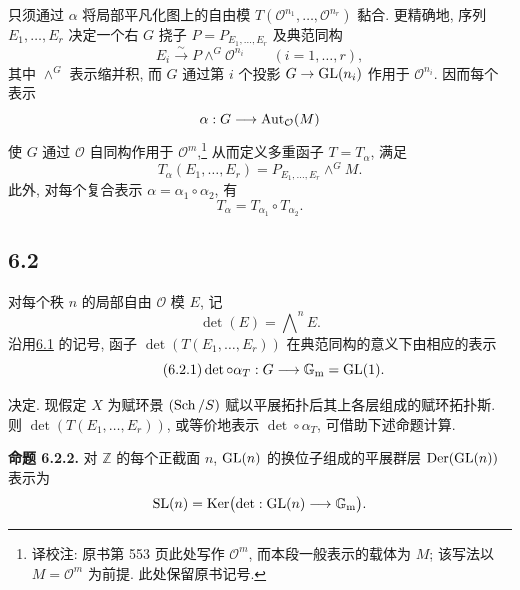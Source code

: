 只须通过 $\alpha$ 将局部平凡化图上的自由模 $T(\mathcal O^{n_1},\ldots,\mathcal O^{n_r})$ 黏合. 更精确地, 序列 $E_1,\ldots,E_r$ 决定一个右 $G$ 挠子 $P=P_{E_1,\ldots,E_r}$ 及典范同构
%
%
%
%
\begin{equation}\tag{6.1.3}
E_i\xrightarrow{\sim}P\mathbin{\wedge^G}\mathcal O^{n_i}
\qquad(i=1,\ldots,r),
\end{equation}
其中 $\wedge^G$ 表示缩并积, 而 $G$ 通过第 $i$ 个投影 $G\to\operatorname{GL}(n_i)$ 作用于 $\mathcal O^{n_i}$. 因而每个表示
%
%
\[
\alpha:G\longrightarrow\operatorname{Aut}_{\mathcal O}(M)
\]
使 $G$ 通过 $\mathcal O$ 自同构作用于 $\mathcal O^m$,\footnote{译校注: 原书第 553 页此处写作 $\mathcal O^m$, 而本段一般表示的载体为 $M$; 该写法以 $M=\mathcal O^m$ 为前提. 此处保留原书记号.} 从而定义多重函子 $T=T_\alpha$, 满足
\begin{equation}\tag{6.1.4}
T_\alpha(E_1,\ldots,E_r)
=P_{E_1,\ldots,E_r}\mathbin{\wedge^G}M.
\end{equation}
此外, 对每个复合表示 $\alpha=\alpha_1\circ\alpha_2$, 有
%
\begin{equation}\tag{6.1.5}
T_\alpha=T_{\alpha_1}\circ T_{\alpha_2}.
\end{equation}

\subsection*{6.2} 对每个秩 $n$ 的局部自由 $\mathcal O$ 模 $E$, 记
%
\[
\det(E)=\bigwedge\nolimits^n E.
\]
沿用\hyperlink{sga6.e10.sec.6.1}{6.1} 的记号, 函子 $\det(T(E_1,\ldots,E_r))$ 在典范同构的意义下由相应的表示
%
\begin{equation}\tag{6.2.1}
\det\circ\alpha_T:G\longrightarrow\mathbb G_{\mathrm m}=\operatorname{GL}(1).
\end{equation}

决定. 现假定 $X$ 为赋环景 $(\operatorname{Sch}/S)$ 赋以平展拓扑后其上各层组成的赋环拓扑斯. 则 $\det(T(E_1,\ldots,E_r))$, 或等价地表示 $\det\circ\alpha_T$, 可借助下述命题计算.
%
%
%

\textbf{命题 6.2.2.} 对 $\mathbb Z$ 的每个正截面 $n$, $\operatorname{GL}(n)$ 的换位子组成的平展群层 $\operatorname{Der}(\operatorname{GL}(n))$ 表示为
%
%
\[
\operatorname{SL}(n)=\operatorname{Ker}\bigl(\det:\operatorname{GL}(n)\longrightarrow\mathbb G_{\mathrm m}\bigr).
\]

